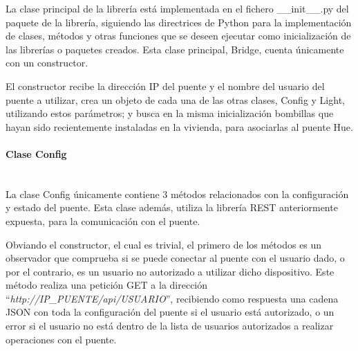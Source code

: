         La clase principal de la librería está implementada en el fichero \_\_init\_\_.py del paquete de la librería, siguiendo las directrices de Python para la implementación de clases, métodos y otras funciones que se deseen ejecutar como inicialización de las librerías o paquetes creados. Esta clase principal, Bridge, cuenta únicamente con un constructor. \\

        \vspace{0.3cm}

        El constructor recibe la dirección IP del puente y el nombre del usuario del puente a utilizar, crea un objeto de cada una de las otras clases, Config y Light, utilizando estos parámetros; y busca en la misma inicialización bombillas que hayan sido recientemente instaladas en la vivienda, para asociarlas al puente Hue.

        \paragraph{Clase Config}\mbox{}\\

        La clase Config únicamente contiene 3 métodos relacionados con la configuración y estado del puente. Esta clase además, utiliza la librería REST anteriormente expuesta, para la comunicación con el puente. \\

        \vspace{0.3cm}

        Obviando el constructor, el cual es trivial, el primero de los métodos es un observador que comprueba si se puede conectar al puente con el usuario dado, o por el contrario, es un usuario no autorizado a utilizar dicho dispositivo. Este método realiza una petición GET a la dirección ``\textit{http://IP\_PUENTE/api/USUARIO}'', recibiendo como respuesta una cadena JSON con toda la configuración del puente si el usuario está autorizado, o un error si el usuario no está dentro de la lista de usuarios autorizados a realizar operaciones con el puente. \\

        \vspace{0.3cm}

